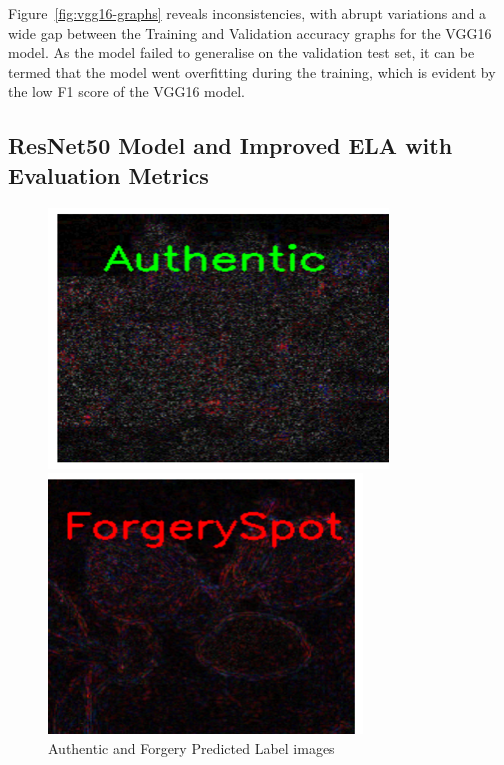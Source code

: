 \documentclass{ieeeaccess}
\begin{document}
  Figure~\ref{fig:vgg16-graphs} reveals inconsistencies, with abrupt variations and a wide gap between the Training and Validation accuracy graphs for the VGG16 model. As the model failed to generalise on the validation test set, it can be termed that the model went overfitting during the training, which is evident by the low F1 score of the VGG16 model.
  
\subsection{ResNet50 Model and Improved ELA with Evaluation Metrics}
    \begin{figure}[h!]
  	\centering
  	\begin{minipage}{0.23\textwidth}
  		\centering
  		\includegraphics[width=\linewidth]{Authentic_img.png}
  	\end{minipage}
  	\hfill
  	\begin{minipage}{0.21\textwidth}
  		\centering
  		\includegraphics[width=\linewidth]{Forgery_img.png}
  		
  	\end{minipage}
  	\caption{Authentic and Forgery Predicted Label images}
  	\label{fig:Authentic_and_ELA}
  \end{figure}
  
\end{document}
